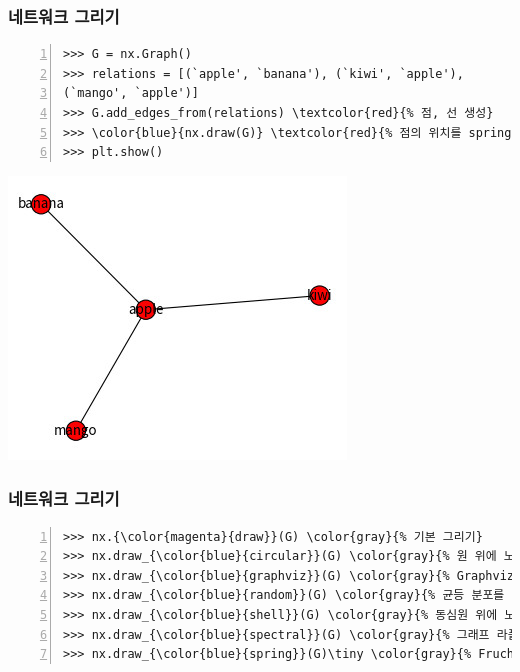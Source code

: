 \documentclass{beamer}
\begin{document}
\begin{frame}[fragile]
\frametitle{네트워크 그리기}
\begin{block}{}
\begin{Verbatim}[numbers=left,commandchars=\\\{\}]
>>> G = nx.Graph()
>>> relations = [(`apple', `banana'), (`kiwi', `apple'), 
(`mango', `apple')]
>>> G.add_edges_from(relations) \textcolor{red}{% 점, 선 생성}
>>> \color{blue}{nx.draw(G)} \textcolor{red}{% 점의 위치를 spring layout으로 생성}
>>> plt.show()
\end{Verbatim}
\end{block}
\begin{center}
\includegraphics[scale=0.55]{network_basic1.jpg}
\end{center}
\end{frame}

\begin{frame}[fragile]
\frametitle{네트워크 그리기}
\begin{block}{}
\begin{Verbatim}[numbers=left,commandchars=\\\{\}]
>>> nx.{\color{magenta}{draw}}(G) \color{gray}{% 기본 그리기}
>>> nx.draw_{\color{blue}{circular}}(G) \color{gray}{% 원 위에 노드 놓기}
>>> nx.draw_{\color{blue}{graphviz}}(G) \color{gray}{% Graphviz 사용}
>>> nx.draw_{\color{blue}{random}}(G) \color{gray}{% 균등 분포를 이용한 랜덤}
>>> nx.draw_{\color{blue}{shell}}(G) \color{gray}{% 동심원 위에 노드 놓기}
>>> nx.draw_{\color{blue}{spectral}}(G) \color{gray}{% 그래프 라플라시안의 고유 벡터 기반}
>>> nx.draw_{\color{blue}{spring}}(G)\tiny \color{gray}{% Fruchterman-Reingold force-directed alg. 기반}
\end{Verbatim}
\end{block}
\end{frame}
\end{document}
